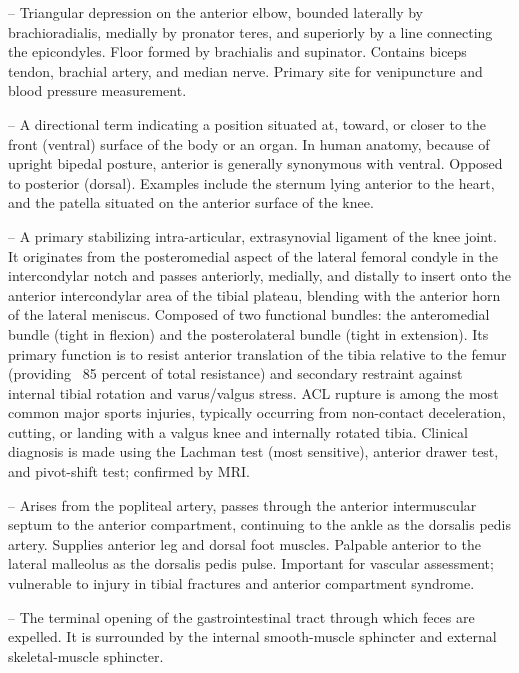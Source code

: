 -- Triangular depression on the anterior elbow, bounded laterally by brachioradialis, medially by pronator teres, and superiorly by a line connecting the epicondyles. Floor formed by brachialis and supinator. Contains biceps tendon, brachial artery, and median nerve. Primary site for venipuncture and blood pressure measurement.

-- A directional term indicating a position situated at, toward, or closer to the front (ventral) surface of the body or an organ. In human anatomy, because of upright bipedal posture, anterior is generally synonymous with ventral. Opposed to posterior (dorsal). Examples include the sternum lying anterior to the heart, and the patella situated on the anterior surface of the knee.

-- A primary stabilizing intra-articular, extrasynovial ligament of the knee joint. It originates from the posteromedial aspect of the lateral femoral condyle in the intercondylar notch and passes anteriorly, medially, and distally to insert onto the anterior intercondylar area of the tibial plateau, blending with the anterior horn of the lateral meniscus. Composed of two functional bundles: the anteromedial bundle (tight in flexion) and the posterolateral bundle (tight in extension). Its primary function is to resist anterior translation of the tibia relative to the femur (providing ~85 percent of total resistance) and secondary restraint against internal tibial rotation and varus/valgus stress. ACL rupture is among the most common major sports injuries, typically occurring from non-contact deceleration, cutting, or landing with a valgus knee and internally rotated tibia. Clinical diagnosis is made using the Lachman test (most sensitive), anterior drawer test, and pivot-shift test; confirmed by MRI.

-- Arises from the popliteal artery, passes through the anterior intermuscular septum to the anterior compartment, continuing to the ankle as the dorsalis pedis artery. Supplies anterior leg and dorsal foot muscles. Palpable anterior to the lateral malleolus as the dorsalis pedis pulse. Important for vascular assessment; vulnerable to injury in tibial fractures and anterior compartment syndrome.

-- The terminal opening of the gastrointestinal tract through which feces are expelled. It is surrounded by the internal smooth-muscle sphincter and external skeletal-muscle sphincter.

